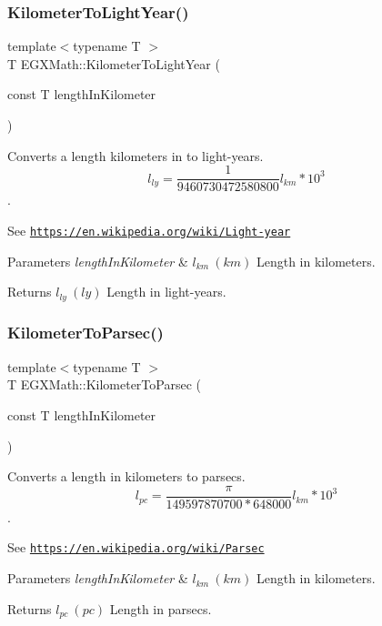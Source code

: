 \subsubsection{\texorpdfstring{Kilometer\+To\+Light\+Year()}{KilometerToLightYear()}}
{\footnotesize\ttfamily template$<$typename T $>$ \\
T E\+G\+X\+Math\+::\+Kilometer\+To\+Light\+Year (\begin{DoxyParamCaption}\item[{const T}]{length\+In\+Kilometer }\end{DoxyParamCaption})}



Converts a length kilometers in to light-\/years. \[ l_{ly}= \frac{1}{9460730472580800} l_{km} * 10^{3} \]. 

See \href{https://en.wikipedia.org/wiki/Light-year}{\tt https\+://en.\+wikipedia.\+org/wiki/\+Light-\/year} 
\begin{DoxyParams}{Parameters}
{\em length\+In\+Kilometer} & $ l_{km}\ (km)$ Length in kilometers. \\
\hline
\end{DoxyParams}
\begin{DoxyReturn}{Returns}
$ l_{ly}\ (ly)$ Length in light-\/years. 
\end{DoxyReturn}
\mbox{\label{group___e_g_x_math-_conversions-_length_conversions-_s_i-_kilometer-_astronomical_ga0d120dfc56490ce318348950abb25dd1}} 
\subsubsection{\texorpdfstring{Kilometer\+To\+Parsec()}{KilometerToParsec()}}
{\footnotesize\ttfamily template$<$typename T $>$ \\
T E\+G\+X\+Math\+::\+Kilometer\+To\+Parsec (\begin{DoxyParamCaption}\item[{const T}]{length\+In\+Kilometer }\end{DoxyParamCaption})}



Converts a length in kilometers to parsecs. \[ l_{pc}=\frac{\pi}{149597870700 * 648000} l_{km} * 10^{3} \]. 

See \href{https://en.wikipedia.org/wiki/Parsec}{\tt https\+://en.\+wikipedia.\+org/wiki/\+Parsec} 
\begin{DoxyParams}{Parameters}
{\em length\+In\+Kilometer} & $ l_{km}\ (km)$ Length in kilometers. \\
\hline
\end{DoxyParams}
\begin{DoxyReturn}{Returns}
$ l_{pc}\ (pc)$ Length in parsecs. 
\end{DoxyReturn}

